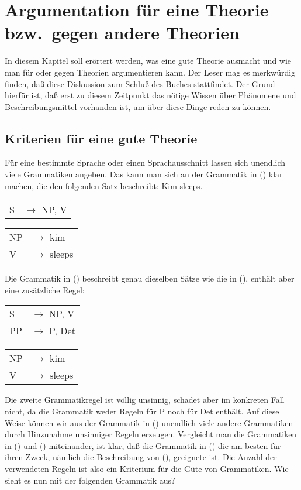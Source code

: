 
\chapter{Argumentation für eine Theorie bzw.\ gegen andere Theorien}
\label{chap-argumentation}


In diesem Kapitel soll erörtert werden, was eine gute Theorie ausmacht
und wie man für oder gegen Theorien argumentieren kann. Der Leser mag
es merkwürdig finden, daß diese Diskussion zum Schluß des Buches stattfindet.
Der Grund hierfür ist, daß erst zu diesem Zeitpunkt das nötige Wissen
über Phänomene und Beschreibungsmittel vorhanden ist, um über diese Dinge reden
zu können.


\section{Kriterien für eine gute Theorie}
\label{sec-kriterien}

Für eine bestimmte Sprache oder einen Sprachausschnitt lassen sich unendlich viele
Grammatiken angeben. Das kann man sich an der Grammatik in () klar machen,
die den folgenden Satz beschreibt:
\ea
Kim sleeps.
\z
\ea\label{gram-kim-sleeps-v}
\begin{tabular}[t]{@{}l@{ }l}       
{S}  & {$\to$ NP, V}
\end{tabular}\hspace{2cm}%
\begin{tabular}[t]{@{}l@{ }l}
{NP} & {$\to$ kim}\\
{V} & {$\to$ sleeps}\\
\end{tabular}
\z
Die Grammatik in () beschreibt genau dieselben Sätze wie die in (),
enthält aber eine zusätzliche Regel:
\ea
\begin{tabular}[t]{@{}l@{ }l}       
{S}  & {$\to$ NP, V}\\
PP   & {$\to$ P, Det}\\
\end{tabular}\hspace{2cm}%
\begin{tabular}[t]{@{}l@{ }l}
{NP} & {$\to$ kim}\\
{V} & {$\to$ sleeps}\\
\end{tabular}
\z
Die zweite Grammatikregel ist völlig unsinnig, schadet aber im konkreten Fall nicht,
da die Grammatik weder Regeln für P noch für Det enthält. Auf diese Weise können wir aus
der Grammatik in () unendlich viele andere Grammatiken durch Hinzunahme unsinniger
Regeln erzeugen. Vergleicht man die Grammatiken in () und () miteinander,
ist klar, daß die Grammatik in () die am besten für ihren Zweck, nämlich die Beschreibung
von (), geeignete ist. Die Anzahl der verwendeten Regeln ist also ein Kriterium für die
Güte von Grammatiken. Wie sieht es nun mit der folgenden Grammatik aus?

